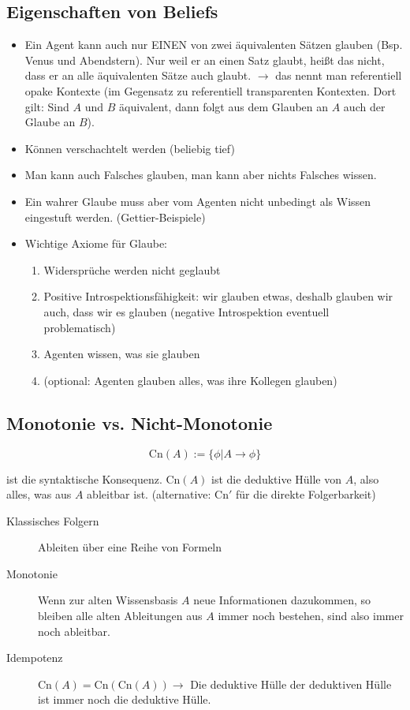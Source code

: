\documentclass[runningheads,deutsch]{llncs}
\begin{document}
\subsection{Eigenschaften von Beliefs}
\begin{itemize}
    \item Ein Agent kann auch nur EINEN von zwei äquivalenten Sätzen glauben (Bsp. Venus und Abendstern). Nur weil er an einen Satz glaubt, heißt das nicht, dass er an alle äquivalenten Sätze auch glaubt. $\rightarrow$ das nennt man referentiell opake Kontexte (im Gegensatz zu referentiell transparenten Kontexten. Dort gilt: Sind $A$ und $B$ äquivalent, dann folgt aus dem Glauben an $A$ auch der Glaube an $B$).
    \item Können verschachtelt werden (beliebig tief)
    \item Man kann auch Falsches glauben, man kann aber nichts Falsches wissen.
    \item Ein wahrer Glaube muss aber vom Agenten nicht unbedingt als Wissen eingestuft werden. (Gettier-Beispiele)
    \item Wichtige Axiome für Glaube:
    \begin{enumerate}
        \item Widersprüche werden nicht geglaubt
        \item Positive Introspektionsfähigkeit: wir glauben etwas, deshalb glauben wir auch, dass wir es glauben (negative Introspektion eventuell problematisch)
        \item Agenten wissen, was sie glauben
        \item (optional: Agenten glauben alles, was ihre Kollegen glauben)
    \end{enumerate}
\end{itemize}

\subsection{Monotonie vs. Nicht-Monotonie}

\[ \text{Cn}(A) := \{\phi | A \rightarrow \phi \} \]

ist die syntaktische Konsequenz. $\text{Cn}(A)$ ist die deduktive Hülle von $A$, also alles, was aus $A$ ableitbar ist. (alternative: $\text{Cn}'$ für die direkte Folgerbarkeit)

\begin{description}
    \item[Klassisches Folgern] Ableiten über eine Reihe von Formeln
    \item[Monotonie] Wenn zur alten Wissensbasis $A$ neue Informationen dazukommen, so bleiben alle alten Ableitungen aus $A$ immer noch bestehen, sind also immer noch ableitbar.
    \item[Idempotenz] $\text{Cn}(A) = \text{Cn}(\text{Cn}(A)) \rightarrow $ Die deduktive Hülle der deduktiven Hülle ist immer noch die deduktive Hülle.
\end{description}
\end{document}
